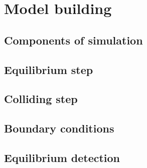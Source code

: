 \chapter{Model building}

\section{Components of simulation}

\section{Equilibrium step}

\section{Colliding step}

\section{Boundary conditions}

\section{Equilibrium detection}
